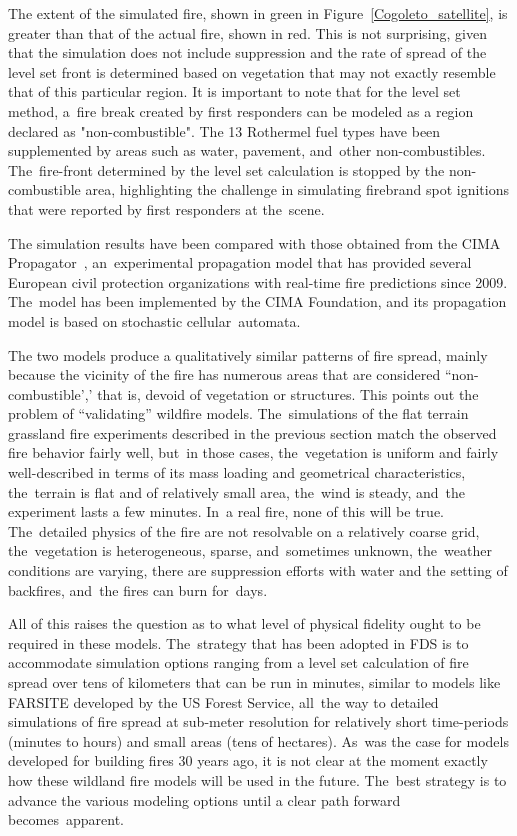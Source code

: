 \documentclass[atmosphere,article,accept,moreauthors,pdftex]{Definitions/mdpi}
\begin{document}
\begin{paracol}{2}
\switchcolumn




The extent of the simulated fire, shown in green in Figure~\ref{Cogoleto_satellite}, is greater than that of the actual fire, shown in red. This is not surprising, given that the simulation does not include suppression and the rate of spread of the level set front is determined based on vegetation that may not exactly resemble that of this particular region. It is important to note that for the level set method, a~fire break created by first responders can be modeled as a region declared as "non-combustible". The 13 Rothermel fuel types have been supplemented by areas such as water, pavement, and~other non-combustibles. The~fire-front determined by the level set calculation is stopped by the non-combustible area, highlighting the challenge in simulating firebrand spot ignitions that were reported by first responders at the~scene.

The simulation results have been compared with those obtained from the CIMA Propagator~\cite{Trucchia:2020}, an~experimental propagation model that has provided several European civil protection organizations with real-time fire predictions since 2009. The~model has been implemented by the CIMA Foundation, and its propagation model is based on stochastic cellular~automata.

The two models produce a qualitatively similar patterns of fire spread, mainly because the vicinity of the fire has numerous areas that are considered ``non-combustible',' that is, devoid of vegetation or structures. This points out the problem of ``validating'' wildfire models. The~simulations of the flat terrain grassland fire experiments described in the previous section match the observed fire behavior fairly well, but~in those cases, the~vegetation is uniform and fairly well-described in terms of its mass loading and geometrical characteristics, the~terrain is flat and of relatively small area, the~wind is steady, and~the experiment lasts a few minutes. In~a real fire, none of this will be true. The~detailed physics of the fire are not resolvable on a relatively coarse grid, the~vegetation is heterogeneous, sparse, and~sometimes unknown, the~weather conditions are varying, there are suppression efforts with water and the setting of backfires, and~the fires can burn for~days.

All of this raises the question as to what level of physical fidelity ought to be required in these models. The~strategy that has been adopted in FDS is to accommodate simulation options ranging from a level set calculation of fire spread over tens of kilometers that can be run in minutes, similar to models like FARSITE developed by the US Forest Service, \mbox{all the} way to detailed simulations of fire spread at sub-meter resolution for relatively short time-periods (minutes to hours) and small areas (tens of hectares). As~was the case for models developed for building fires 30 years ago, it is not clear at the moment exactly how these wildland fire models will be used in the future. The~best strategy is to advance the various modeling options until a clear path forward becomes~apparent.



\end{paracol}
\end{document}
